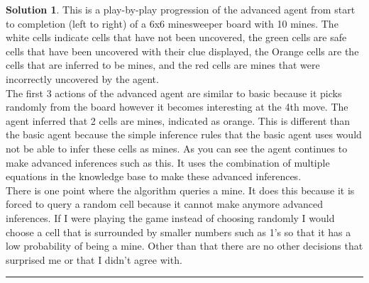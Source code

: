 \documentclass{article}
\theoremstyle{definition}
\def\fline{\rule{0.75\linewidth}{0.5pt}}
\newcommand{\finishline}{\vspace{-15pt}\begin{center}\fline\end{center}}
\newtheorem*{solution*}{Solution}
\newenvironment{solution}{\begin{solution*}}{{\finishline} \end{solution*}}
\begin{document}
\begin{solution}
	This is a play-by-play progression of the advanced agent from start to completion (left to right) of a 6x6 minesweeper board with 10 mines. The white cells indicate cells that have not been uncovered, the green cells are safe cells that have been uncovered with their clue displayed, the Orange cells are the cells that are inferred to be mines, and the red cells are mines that were incorrectly uncovered by the agent.\\
	The first 3 actions of the advanced agent are similar to basic because it picks randomly from the board however it becomes interesting at the 4th move. The agent inferred that 2 cells are mines, indicated as orange. This is different than the basic agent because the simple inference rules that the basic agent uses would not be able to infer these cells as mines. As you can see the agent continues to make advanced inferences such as this. It uses the combination of multiple equations in the knowledge base to make these advanced inferences.\\
    There is one point where the algorithm queries a mine. It does this because it is forced to query a random cell because it cannot make anymore advanced inferences. If I were playing the game instead of choosing randomly I would choose a cell that is surrounded by smaller numbers such as 1’s so that it has a low probability of being a mine. Other than that there are no other decisions that surprised me or that I didn't agree with.

\end{solution}
\smallskip
\end{document}
